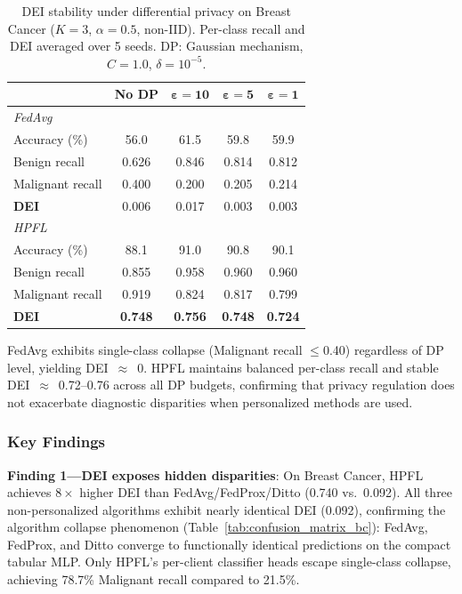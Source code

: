 \documentclass[conference,a4paper]{IEEEtran}
\begin{document}
\begin{table}[htbp]
\centering
\caption{DEI stability under differential privacy on Breast Cancer ($K{=}3$, $\alpha{=}0.5$, non-IID). Per-class recall and DEI averaged over 5 seeds. DP: Gaussian mechanism, $C{=}1.0$, $\delta{=}10^{-5}$.}
\label{tab:dei_dp}
\small
\begin{tabular}{lcccc}
\toprule
& \textbf{No DP} & $\boldsymbol{\varepsilon{=}10}$ & $\boldsymbol{\varepsilon{=}5}$ & $\boldsymbol{\varepsilon{=}1}$ \\
\midrule
\multicolumn{5}{l}{\textit{FedAvg}} \\
\quad Accuracy (\%) & 56.0 & 61.5 & 59.8 & 59.9 \\
\quad Benign recall & 0.626 & 0.846 & 0.814 & 0.812 \\
\quad Malignant recall & 0.400 & 0.200 & 0.205 & 0.214 \\
\quad \textbf{DEI} & 0.006 & 0.017 & 0.003 & 0.003 \\
\midrule
\multicolumn{5}{l}{\textit{HPFL}} \\
\quad Accuracy (\%) & 88.1 & 91.0 & 90.8 & 90.1 \\
\quad Benign recall & 0.855 & 0.958 & 0.960 & 0.960 \\
\quad Malignant recall & 0.919 & 0.824 & 0.817 & 0.799 \\
\quad \textbf{DEI} & \textbf{0.748} & \textbf{0.756} & \textbf{0.748} & \textbf{0.724} \\
\bottomrule
\end{tabular}

\vspace{1mm}
\footnotesize{FedAvg exhibits single-class collapse (Malignant recall $\leq$0.40) regardless of DP level, yielding DEI~$\approx$~0. HPFL maintains balanced per-class recall and stable DEI~$\approx$~0.72--0.76 across all DP budgets, confirming that privacy regulation does not exacerbate diagnostic disparities when personalized methods are used.}
\end{table}

\subsubsection{Key Findings}

\textbf{Finding 1---DEI exposes hidden disparities}: On Breast Cancer, HPFL achieves $8\times$ higher DEI than FedAvg/FedProx/Ditto (0.740 vs.\ 0.092). All three non-personalized algorithms exhibit nearly identical DEI (0.092), confirming the algorithm collapse phenomenon (Table~\ref{tab:confusion_matrix_bc}): FedAvg, FedProx, and Ditto converge to functionally identical predictions on the compact tabular MLP. Only HPFL's per-client classifier heads escape single-class collapse, achieving 78.7\% Malignant recall compared to 21.5\%.
\end{document}
